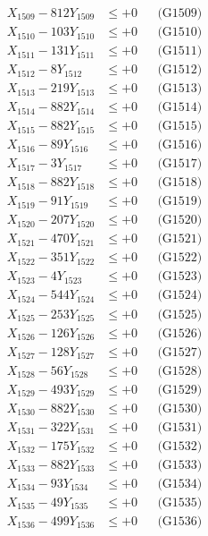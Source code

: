 \documentclass[a4paper,10pt]{article}
\begin{document}
{\begin{align}
X_{1509} - 812Y_{1509} &\leq +0 && \text{(G1509)} \\
X_{1510} - 103Y_{1510} &\leq +0 && \text{(G1510)} \\
\allowbreak
X_{1511} - 131Y_{1511} &\leq +0 && \text{(G1511)} \\
X_{1512} - 8Y_{1512} &\leq +0 && \text{(G1512)} \\
X_{1513} - 219Y_{1513} &\leq +0 && \text{(G1513)} \\
X_{1514} - 882Y_{1514} &\leq +0 && \text{(G1514)} \\
X_{1515} - 882Y_{1515} &\leq +0 && \text{(G1515)} \\
X_{1516} - 89Y_{1516} &\leq +0 && \text{(G1516)} \\
X_{1517} - 3Y_{1517} &\leq +0 && \text{(G1517)} \\
X_{1518} - 882Y_{1518} &\leq +0 && \text{(G1518)} \\
X_{1519} - 91Y_{1519} &\leq +0 && \text{(G1519)} \\
X_{1520} - 207Y_{1520} &\leq +0 && \text{(G1520)} \\
\allowbreak
X_{1521} - 470Y_{1521} &\leq +0 && \text{(G1521)} \\
X_{1522} - 351Y_{1522} &\leq +0 && \text{(G1522)} \\
X_{1523} - 4Y_{1523} &\leq +0 && \text{(G1523)} \\
X_{1524} - 544Y_{1524} &\leq +0 && \text{(G1524)} \\
X_{1525} - 253Y_{1525} &\leq +0 && \text{(G1525)} \\
X_{1526} - 126Y_{1526} &\leq +0 && \text{(G1526)} \\
X_{1527} - 128Y_{1527} &\leq +0 && \text{(G1527)} \\
X_{1528} - 56Y_{1528} &\leq +0 && \text{(G1528)} \\
X_{1529} - 493Y_{1529} &\leq +0 && \text{(G1529)} \\
X_{1530} - 882Y_{1530} &\leq +0 && \text{(G1530)} \\
\allowbreak
X_{1531} - 322Y_{1531} &\leq +0 && \text{(G1531)} \\
X_{1532} - 175Y_{1532} &\leq +0 && \text{(G1532)} \\
X_{1533} - 882Y_{1533} &\leq +0 && \text{(G1533)} \\
X_{1534} - 93Y_{1534} &\leq +0 && \text{(G1534)} \\
X_{1535} - 49Y_{1535} &\leq +0 && \text{(G1535)} \\
X_{1536} - 499Y_{1536} &\leq +0 && \text{(G1536)} \\

\end{align}}
\end{document}
